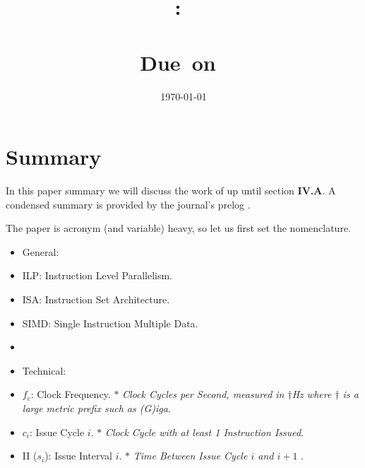 \documentclass{article}
\title{
    \vspace{2in}
    \textmd{\textbf{\hmwkClass:\ \\ \hmwkTitle}}\\
    \normalsize\vspace{0.1in}\small{Due\ on\ \hmwkDueDate}\\
    \vspace{0.1in}\Large{\textit{\paprTitle}}
    \vspace{3in}
}
\author{\hmwkAuthorName}
\date{\today}
\begin{document}
\maketitle

\pagebreak



\section{Summary}

In this paper summary we will discuss the work of \cite{Sima} 
up until section \textbf{IV.A}.
A condensed summary is provided by the journal's prelog \cite{Falk}.

The paper is acronym (and variable) heavy, so let us first set the nomenclature. 

\begin{itemize}
    \item[] General:
    \item ILP: Instruction Level Parallelism.
    \item ISA: Instruction Set Architecture.
    \item SIMD: Single Instruction Multiple Data.
    \item[] \dotfill
    \item[] Technical:
    \item \(f_{c}\): Clock Frequency.
    \subitem \(\ast\) \emph{Clock Cycles per Second, measured in \(\dagger\)Hz where \(\dagger\) is a large metric prefix such as (G)iga}. 
    \item \(c_{i}\): Issue Cycle \(i\).
    \subitem \(\ast\) \emph{Clock Cycle with at least 1 Instruction Issued}. 
    \item II (\(s_{i}\)): Issue Interval \(i\).
    \subitem \(\ast\) \emph{Time Between Issue Cycle \(i\) and \(i+1\) }.

\end{itemize}
\end{document}
